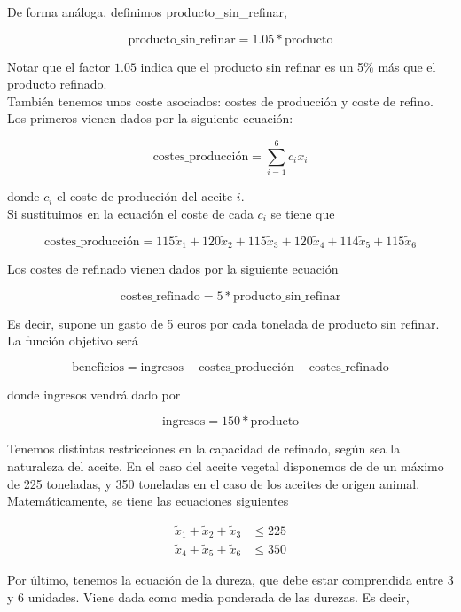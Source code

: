 \documentclass[12pt,a4paper,twoside,openright,titlepage,final]{article}
\begin{document}
De forma análoga, definimos {producto\_sin\_refinar}, 

\[ \text{producto\_sin\_refinar} = 1.05*\text{producto}\]

Notar que el factor $1.05$ indica que el producto sin refinar es un 5\% más que el producto refinado.\\

También tenemos unos coste asociados: costes de producción y coste de refino. Los primeros vienen dados por la siguiente ecuación:

\[ \text{costes\_producción} = \sum_{i=1}^{6} c_i x_i \]

donde $c_i$ el coste de producción del aceite $i$.\\

Si sustituimos en la ecuación el coste de cada $c_i$ se tiene que

\[ \text{costes\_producción} = 115\tilde{x}_1 + 120\tilde{x}_2 + 115\tilde{x}_3 + 120\tilde{x}_4 + 114\tilde{x}_5 + 115\tilde{x}_6 \]

Los costes de refinado vienen dados por la siguiente ecuación

\[ \text{costes\_refinado} = 5*\text{producto\_sin\_refinar} \]

Es decir, supone un gasto de 5 euros por cada tonelada de producto sin refinar.\\

La función objetivo será 

\[ \text{beneficios} = \text{ingresos} - \text{costes\_producción} - \text{costes\_refinado} \]

donde ingresos vendrá dado por

\[ \text{ingresos} = 150*\text{producto} \]

Tenemos distintas restricciones en la capacidad de refinado, según sea la naturaleza del aceite. En el caso del aceite vegetal disponemos de de un máximo de 225 toneladas, y 350 toneladas en el caso de los aceites de origen animal.\\

Matemáticamente, se tiene las ecuaciones siguientes

\begin{align*}
\tilde{x}_1 + \tilde{x}_2 + \tilde{x}_3 & \leq 225\\
\tilde{x}_4 + \tilde{x}_5 + \tilde{x}_6 & \leq 350
\end{align*}

Por último, tenemos la ecuación de la dureza, que debe estar comprendida entre 3 y 6 unidades. Viene dada como media ponderada de las durezas. Es decir,
\end{document}
